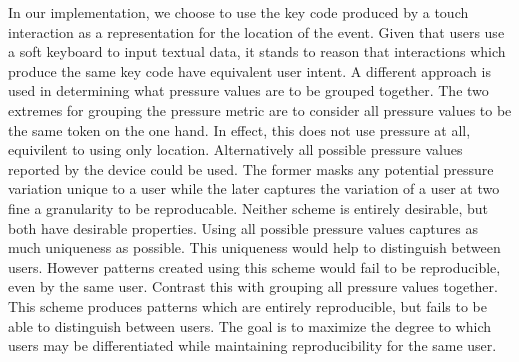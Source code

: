 In our implementation,
we choose to use the key code produced by 
a touch interaction as a representation 
for the location of the event.
Given that users use a soft keyboard to input
textual data, it stands to reason that
interactions which produce the same key code have equivalent user intent.
%
A different approach is used in determining
what pressure values are to be grouped together.
%
The two extremes for grouping the pressure metric 
are to consider all pressure values to be the same token on the one hand.
In effect, this does not use pressure at all, 
equivilent to using only location.
%
Alternatively all possible pressure values reported
by the device could be used.
%
The former masks any potential pressure variation unique to a user while
the later captures the variation of a user at two fine a granularity
to be reproducable.
Neither scheme is entirely desirable, 
but both have desirable properties.
%
Using all possible pressure values captures
as much uniqueness as possible.
This uniqueness would help to distinguish between users.
However patterns created using this scheme would 
fail to be reproducible, even by the same user.
%
Contrast this with grouping all pressure values together. 
This scheme produces patterns which are entirely reproducible, but
fails to be able to distinguish between users.
%
The goal is to maximize the degree to which users
may be differentiated while maintaining
reproducibility for the same user.

